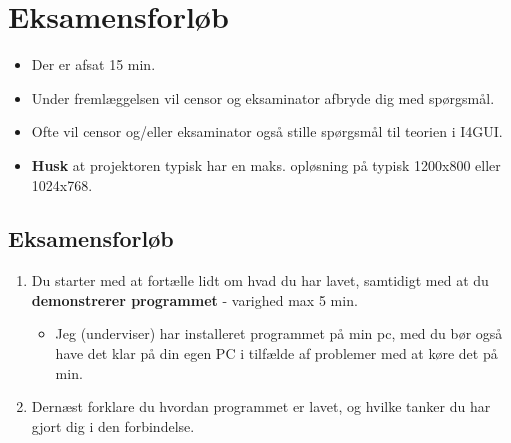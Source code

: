 \section{Eksamensforløb}


\begin{itemize}
	\item Der er afsat 15 min.
	\item Under fremlæggelsen vil censor og eksaminator afbryde dig med spørgsmål.
	\item Ofte vil censor og/eller eksaminator også stille spørgsmål til teorien i I4GUI.
	\item \textbf{Husk} at projektoren typisk har en maks. opløsning på typisk 1200x800 eller 1024x768.
\end{itemize}

\subsection{Eksamensforløb}

\begin{enumerate}
	\item Du starter med at fortælle lidt om hvad du har lavet, samtidigt med at du \textbf{demonstrerer programmet} - varighed max 5 min.
	
	\begin{itemize}
		\item Jeg (underviser) har installeret programmet på min pc, med du bør også have det klar på din egen PC i tilfælde af problemer med at køre det på min.
	\end{itemize}
	
	\item Dernæst forklare du hvordan programmet er lavet, og hvilke tanker du har gjort dig i den forbindelse.
\end{enumerate}